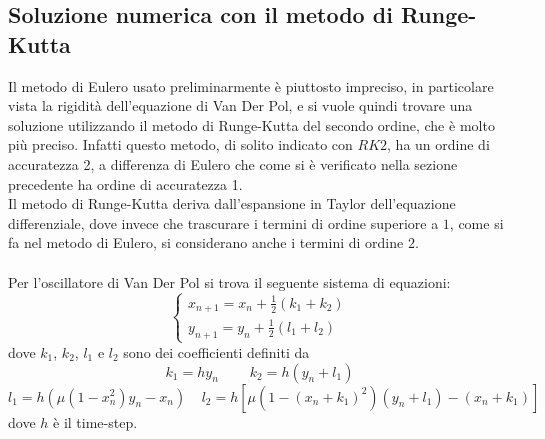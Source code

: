 \documentclass[12pt]{article}
\begin{document}
\subsection{Soluzione numerica con il metodo di Runge-Kutta }
Il metodo di Eulero usato preliminarmente è piuttosto impreciso, in particolare vista la rigidità dell'equazione di Van Der Pol, e si vuole quindi trovare una soluzione utilizzando il metodo di Runge-Kutta del secondo ordine, che è molto più preciso. Infatti questo metodo, di solito indicato con $RK2$, ha un ordine di accuratezza 2, a differenza di Eulero che come si è verificato nella sezione precedente ha ordine di accuratezza 1. \\
Il metodo di Runge-Kutta deriva dall'espansione in Taylor dell'equazione differenziale, dove invece che trascurare i termini di ordine superiore a $1$, come si fa nel metodo di Eulero, si considerano anche i termini di ordine $2$. \\ \\
Per l'oscillatore di Van Der Pol si trova il seguente sistema di equazioni:
\begin{equation}
	\begin{cases}
		x_{n+1} = x_n + \frac{1}{2}(k_1 + k_2) \\
		y_{n+1} = y_n + \frac{1}{2}(l_1 + l_2)
	\end{cases}
\end{equation}
dove $k_1$, $k_2$, $l_1$ e $l_2$ sono dei coefficienti definiti da
\begin{equation}
	k_1 = hy_n \ \ \ \ \ \ \ \ \ \ k_2 = h(y_n + l_1) 
\end{equation}
\begin{equation}
	l_1 =  h\left(\mu(1-x_n^2)y _n - x_n\right) \ \ \ \ \  l_2 = h \left[\mu\left(1-(x_n + k_1)^2\right)\left(y_n + l_1\right) - (x_n + k_1)\right]
\end{equation}
dove $h$ è il time-step.
\end{document}
